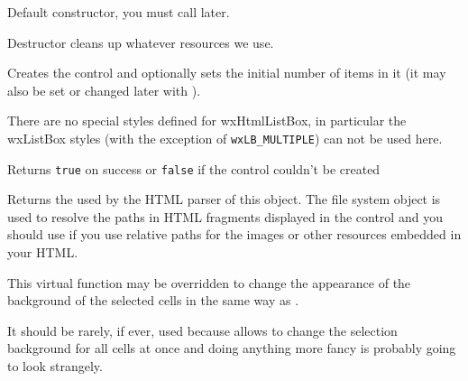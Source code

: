 Default constructor, you must call 
later.


\label{wxhtmllistboxdtor}


Destructor cleans up whatever resources we use.


\label{wxhtmllistboxcreate}


Creates the control and optionally sets the initial number of items in it
(it may also be set or changed later with
).

There are no special styles defined for wxHtmlListBox, in particular the
wxListBox styles (with the exception of {\tt wxLB_MULTIPLE}) can not be used here.

Returns {\tt true} on success or {\tt false} if the control couldn't be created


\label{wxhtmllistboxgetfilesystem}



Returns the  used by the HTML parser of
this object. The file system object is used to resolve the paths in HTML
fragments displayed in the control and you should use
 if you use
relative paths for the images or other resources embedded in your HTML.


\label{wxhtmllistboxgetselectedtextbgcolour}


This virtual function may be overridden to change the appearance of the
background of the selected cells in the same way as
.

It should be rarely, if ever, used because
 allows to
change the selection background for all cells at once and doing anything more
fancy is probably going to look strangely.

